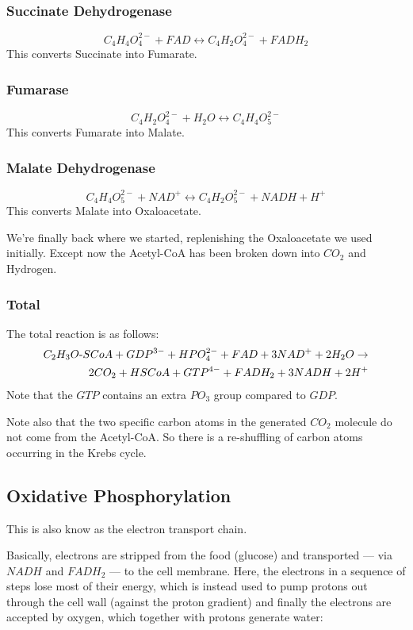 \documentclass{article}
\def\mhyphen{{\hbox{-}}}
\begin{document}
\subsubsection{Succinate Dehydrogenase}
\[
    C_4H_4O_4^{2-} + FAD \leftrightarrow C_4H_2O_4^{2-} + FADH_2
\]
This converts Succinate into Fumarate.

\subsubsection{Fumarase}
\[
    C_4H_2O_4^{2-} + H_2O \leftrightarrow C_4H_4O_5^{2-}
\]
This converts Fumarate into Malate.

\subsubsection{Malate Dehydrogenase}\label{sec_malate_dehydrogenase}
\[
    C_4H_4O_5^{2-} + NAD^+ \leftrightarrow C_4H_2O_5^{2-} + NADH + H^+
\]
This converts Malate into Oxaloacetate.

We're finally back where we started, replenishing the Oxaloacetate we used initially.
Except now the Acetyl-CoA has been broken down into $CO_2$ and Hydrogen.

\subsubsection{Total}
The total reaction is as follows:
\[
    \begin{split}
    C_2H_3O{\mhyphen}SCoA + GDP^{3-}+ HPO_4^{2-} + FAD + 3NAD^+ + 2H_2O \rightarrow \\
    2CO_2 + HSCoA + GTP^{4-} + FADH_2 + 3NADH + 2H^+
    \end{split}
\]
Note that the $GTP$ contains an extra $PO_3$ group compared to $GDP$.

Note also that the two specific carbon atoms in the generated $CO_2$ molecule do not come
from the Acetyl-CoA. So there is a re-shuffling of carbon atoms occurring in the Krebs
cycle.

\subsection{Oxidative Phosphorylation}
This is also know as the electron transport chain.

Basically, electrons are stripped from the food (glucose) and transported --- via $NADH$
and $FADH_2$ --- to the cell membrane. Here, the electrons in a sequence of steps
lose most of their energy, which is instead used to pump protons out through
the cell wall (against the proton gradient) and finally the electrons are accepted by
oxygen, which together with protons generate water:
\end{document}
